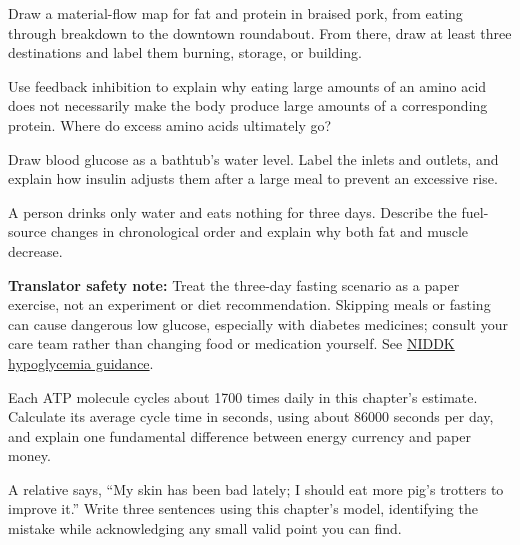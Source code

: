 \begin{sikaoti}
\item Draw a material-flow map for fat and protein in braised pork, from eating through breakdown to the downtown roundabout. From there, draw at least three destinations and label them burning, storage, or building.
\item Use feedback inhibition to explain why eating large amounts of an amino acid does not necessarily make the body produce large amounts of a corresponding protein. Where do excess amino acids ultimately go?
\item Draw blood glucose as a bathtub's water level. Label the inlets and outlets, and explain how insulin adjusts them after a large meal to prevent an excessive rise.
\item A person drinks only water and eats nothing for three days. Describe the fuel-source changes in chronological order and explain why both fat and muscle decrease.

\textbf{Translator safety note:} Treat the three-day fasting scenario as a paper exercise, not an experiment or diet recommendation. Skipping meals or fasting can cause dangerous low glucose, especially with diabetes medicines; consult your care team rather than changing food or medication yourself. See \href{https://www.niddk.nih.gov/health-information/diabetes/overview/preventing-problems/low-blood-glucose-hypoglycemia}{NIDDK hypoglycemia guidance}.

\item Each ATP molecule cycles about 1700 times daily in this chapter's estimate. Calculate its average cycle time in seconds, using about 86000 seconds per day, and explain one fundamental difference between energy currency and paper money.
\item A relative says, ``My skin has been bad lately; I should eat more pig's trotters to improve it.'' Write three sentences using this chapter's model, identifying the mistake while acknowledging any small valid point you can find.
\end{sikaoti}
